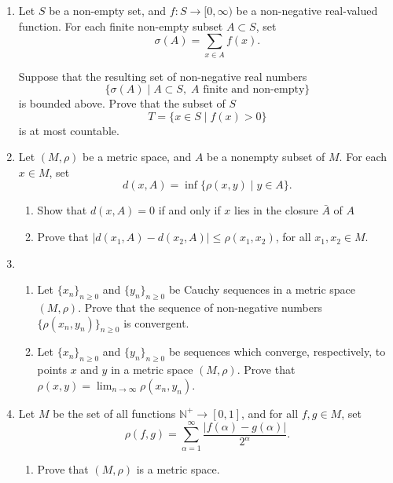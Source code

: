 \documentclass[11pt]{article}
\begin{document}
\begin{enumerate}
  \item Let \(S\) be a non-empty set, and \(f: S \to [0, \infty)\) be a non-negative real-valued function.
    For each finite non-empty subset \(A \subset S\), set 
    \[\sigma(A) = \sum_{x \in A} f(x).\]

    Suppose that the resulting set of non-negative real numbers 
    \[\{\sigma(A) \mid A \subset S, \; A \text{ finite and non-empty}\}\] is bounded above.  
    Prove that the subset of \(S\) 
    \[T = \{x \in S \mid f(x) > 0\}\]
    is at most countable.
    \newpage

  \item Let \((M, \rho)\) be a metric space, and \(A\) be a nonempty subset of \(M\).  For each \(x \in M\), set 
    \[d(x, A) = \inf \{\rho(x,y) \mid y \in A\}.\]
    \begin{enumerate}[label=(\roman*)]
      \item Show that \(d(x, A) = 0\) if and only if \(x\) lies in the closure \(\bar A\) of \(A\)

      \item Prove that \(|d(x_1,A) - d(x_2,A)| \leq \rho(x_1,x_2)\), for all \(x_1, x_2 \in M\).
    \end{enumerate}
    \newpage

  \item \begin{enumerate}[label=(\roman*)]
      \item Let \(\{x_n\}_{n \geq 0}\) and  \(\{y_n\}_{n \geq 0}\) be Cauchy sequences in a metric space 
        \((M, \rho)\).  Prove that the sequence of non-negative numbers \(\{\rho(x_n,y_n)\}_{n \geq 0}\) is 
        convergent.

      \item Let \(\{x_n\}_{n \geq 0}\) and  \(\{y_n\}_{n \geq 0}\) be sequences which converge, respectively, 
        to points \(x\) and \(y\) in a metric space \((M, \rho)\).  Prove that 
        \(\rho(x,y) = \displaystyle\lim_{n \to \infty} \rho(x_n,y_n)\).
    \end{enumerate} 
    \newpage
    
  \item Let \(M\) be the set of all functions \(\mathbb{N}^+ \to [0,1]\), and for all \(f,g \in M\), set
    \[\rho(f,g) = \sum_{\alpha=1}^{\infty} \frac{|f(\alpha) - g(\alpha)|}{2^\alpha}.\]

    \begin{enumerate}[label=(\roman*)]
      \item Prove that \((M,\rho)\) is a metric space.
      

\end{enumerate}
\end{enumerate}
\end{document}
